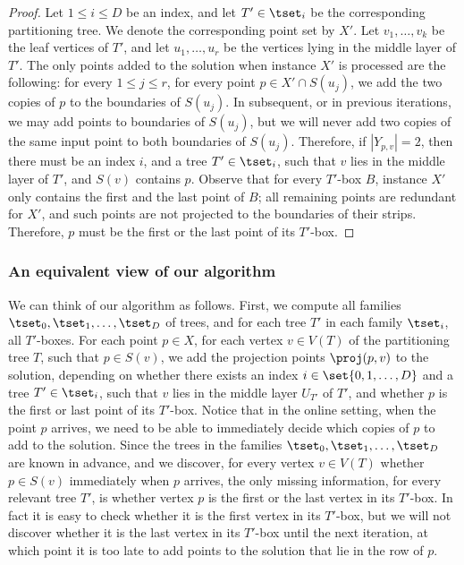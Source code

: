 \begin{proof}
	Let $1\leq i\leq D$ be an index, and let $T'\in \tset_i$ be the corresponding partitioning tree. We denote the corresponding point set by $X'$. Let $v_1,\ldots,v_k$ be the leaf vertices of $T'$, and let $u_1,\ldots,u_r$ be the vertices lying in the middle layer of $T'$. The only points added to the solution when instance $X'$ is processed are the following: for every $1\leq j\leq r$, for every point $p\in X'\cap S(u_j)$, we add the two copies of $p$ to the boundaries of $S(u_j)$. In subsequent, or in previous iterations, we may add points to boundaries of $S(u_j)$, but we will never add two copies of the same input point to both boundaries of $S(u_j)$. Therefore, if $|Y_{p,v}|=2$, then there must be an index $i$, and a tree $T'\in \tset_i$, such that $v$ lies in the middle layer of $T'$, and $S(v)$ contains $p$. Observe that for every $T'$-box $B$, instance $X'$ only contains the first and the last point of $B$; all remaining points are redundant for $X'$, and such points are not projected to the boundaries of their strips. Therefore, $p$ must be the first or the last point of its $T'$-box.
	\end{proof}



\subsubsection{An equivalent view of our algorithm}


We can think of our algorithm as follows.
First, we compute all families $\tset_0,\tset_1, \ldots, \tset_D$ of trees, and for each tree $T'$ in each family $\tset_i$, all $T'$-boxes.
For each point $p \in X$, for each vertex $v \in V(T)$ of the partitioning tree $T$, such that $p\in S(v)$, we add the projection points $\proj(p,v)$ to the solution, depending on whether there exists an index $i \in \set{0,1,\ldots, D}$ and a tree $T' \in \tset_i$, such that $v$ lies in the middle layer $U_{T'}$ of $T'$,  and whether $p$ is the first or last point of its $T'$-box. Notice that in the online setting, when the point $p$ arrives, we need to be able to immediately decide which copies of $p$ to add to the solution. Since the trees in the families $\tset_0,\tset_1,\ldots,\tset_D$ are known in advance, and we discover, for every vertex $v\in V(T)$ whether $p\in S(v)$ immediately when $p$ arrives, the only missing information, for every relevant tree $T'$, is whether vertex $p$ is the first or the last vertex in its $T'$-box. In fact it is easy to check whether it is the first vertex in its $T'$-box, but we will not discover whether it is the last vertex in its $T'$-box until the next iteration, at which point it is too late to add points to the solution that lie in the row of $p$.


